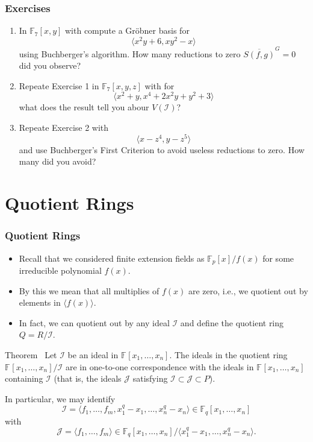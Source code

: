 \documentclass[9pt]{beamer}
\newcommand{\memph}[1]{{\color{yellow9}{\bf #1}}\xspace}
\newcommand{\F}[1][]{\ensuremath{\mathbb{F}_{#1}}\xspace}
\newcommand{\I}{\ensuremath{\mathcal{I}}\xspace}
\newcommand{\gens}{\ensuremath{x_1,\dots,x_{n}}\xspace}
\newcommand{\ideal}[1]{\ensuremath{\langle #1\rangle}\xspace}
\begin{document}
\begin{frame}
\frametitle{Exercises}

\begin{enumerate}
 \item In $\F[7][x,y]$ with \memph{deglex} compute a Gröbner basis for $$\ideal{x^{2} y + 6, x y^{2} -  x}$$ using Buchberger's algorithm. How many reductions to zero $\overline{S(f,g)}^G = 0$ did you observe?
\item Repeate Exercise 1 in $\F[7][x,y,z]$ with \memph{deglex} for $$\ideal{x^{2} + y, x^{4} + 2 x^{2} y + y^{2} + 3}$$ what does the result tell you abour $V(\I)$?
\item Repeate Exercise 2 with $$\ideal{x - z^4, y - z^5}$$ and use Buchberger's First Criterion to avoid useless reductions to zero. How many did you avoid?
\end{enumerate}
 
\end{frame}

\section{Quotient Rings}

\begin{frame}[allowframebreaks]
\frametitle{Quotient Rings}

\begin{itemize}
 \item Recall that we considered finite extension fields as $\F[p][x]/f(x)$ for some irreducible polynomial $f(x)$.
 \item By this we mean that all multiplies  of $f(x)$ are zero, i.e., we quotient out by elements in $\ideal{f(x)}$.
 \item In fact, we can quotient out by any ideal $\I$ and define the quotient ring $Q = R/\I$.
\end{itemize}


\begin{block}{Theorem~\cite[p.226]{cox-little-oshea:2007}}
Let $\I$ be an ideal in $\F[][\gens]$. The ideals in the quotient ring $\F[][\gens]/\I$ are in one-to-one
correspondence with the ideals in $\F[][\gens]$ containing $\I$ (that is, the ideals $\mathcal{J}$ satisfying $\I \subset \mathcal{J} \subset P$).
\end{block}

In particular, we may identify \[\I = \ideal{f_1,\dots,f_m,x_1^q - x_1,\dots,x_{n}^q-x_{n}} \in \F[q][x_1,\dots,x_{n}]\] with \[\mathcal{J} = \ideal{f_1,\dots,f_m} \in \F[q][x_1,\dots,x_{n}]/\ideal{x_1^q - x_1,\dots,x_{n}^q-x_{n}}.\]

\end{frame}
\end{document}
